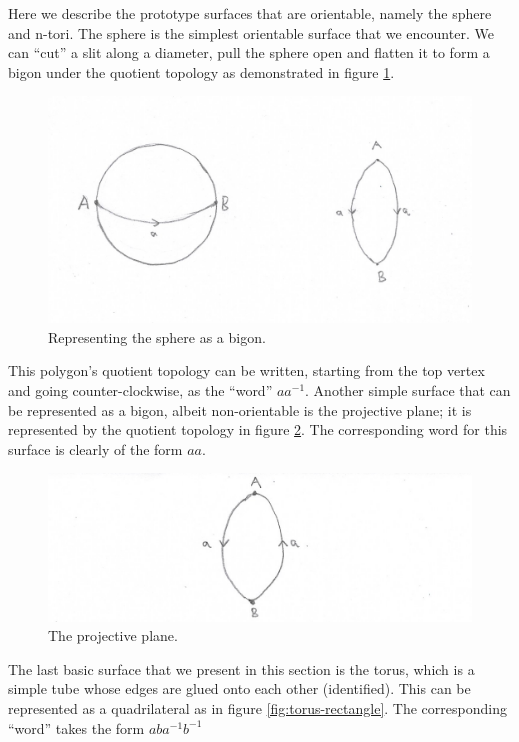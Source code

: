 Here we describe the prototype surfaces that are orientable, namely
the sphere and n-tori. The sphere is the simplest orientable surface
that we encounter. We can ``cut'' a slit along a diameter, pull the
sphere open and flatten it to form a bigon under the quotient topology
as demonstrated in figure \ref{fig:sphere-bigon}.

\begin{figure}[htbp]
  \centering
  \includegraphics[width=14cm]{sphere.png}
  \caption{Representing the sphere as a bigon.}
  \label{fig:sphere-bigon}
\end{figure}

This polygon's quotient topology can be written, starting from the top
vertex and going counter-clockwise, as  the ``word''
$aa^{-1}$. Another simple surface that can be represented as a bigon,
albeit non-orientable is the projective plane; it is represented by
the quotient topology in figure
\ref{fig:projective-plane-bigon}. The corresponding word for this surface
is clearly of the form $aa$.

\begin{figure}[htbp]
  \centering
  \includegraphics[width=13.5cm]{projective.png}
  \caption{The projective plane.}
  \label{fig:projective-plane-bigon}
\end{figure}

The last basic surface that we present in this section is the torus,
which is a simple tube whose edges are glued onto each other
(identified). This can be represented as a quadrilateral as in figure
\ref{fig:torus-rectangle}. The corresponding ``word'' takes the form
$aba^{-1}b^{-1}$ 

